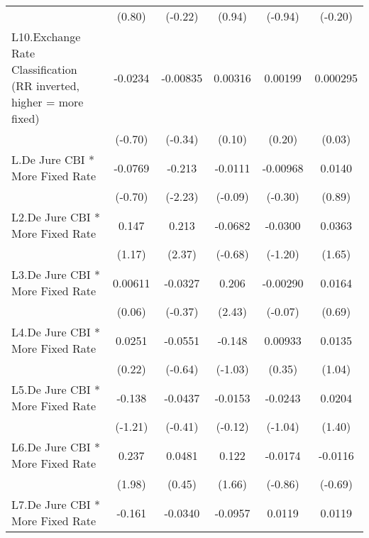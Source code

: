 {\begin{tabular*}{\linewidth}{@{\hskip\tabcolsep\extracolsep\fill}l*{5}{c}}
                &   (0.80)         &  (-0.22)         &   (0.94)         &  (-0.94)         &  (-0.20)         \\
[1em]
L10.Exchange Rate Classification (RR inverted, higher = more fixed)&  -0.0234         & -0.00835         &  0.00316         &  0.00199         & 0.000295         \\
                &  (-0.70)         &  (-0.34)         &   (0.10)         &   (0.20)         &   (0.03)         \\
[1em]
L.De Jure CBI * More Fixed Rate&  -0.0769         &   -0.213\sym{*}  &  -0.0111         & -0.00968         &   0.0140         \\
                &  (-0.70)         &  (-2.23)         &  (-0.09)         &  (-0.30)         &   (0.89)         \\
[1em]
L2.De Jure CBI * More Fixed Rate&    0.147         &    0.213\sym{*}  &  -0.0682         &  -0.0300         &   0.0363         \\
                &   (1.17)         &   (2.37)         &  (-0.68)         &  (-1.20)         &   (1.65)         \\
[1em]
L3.De Jure CBI * More Fixed Rate&  0.00611         &  -0.0327         &    0.206\sym{*}  & -0.00290         &   0.0164         \\
                &   (0.06)         &  (-0.37)         &   (2.43)         &  (-0.07)         &   (0.69)         \\
[1em]
L4.De Jure CBI * More Fixed Rate&   0.0251         &  -0.0551         &   -0.148         &  0.00933         &   0.0135         \\
                &   (0.22)         &  (-0.64)         &  (-1.03)         &   (0.35)         &   (1.04)         \\
[1em]
L5.De Jure CBI * More Fixed Rate&   -0.138         &  -0.0437         &  -0.0153         &  -0.0243         &   0.0204         \\
                &  (-1.21)         &  (-0.41)         &  (-0.12)         &  (-1.04)         &   (1.40)         \\
[1em]
L6.De Jure CBI * More Fixed Rate&    0.237\sym{*}  &   0.0481         &    0.122         &  -0.0174         &  -0.0116         \\
                &   (1.98)         &   (0.45)         &   (1.66)         &  (-0.86)         &  (-0.69)         \\
[1em]
L7.De Jure CBI * More Fixed Rate&   -0.161         &  -0.0340         &  -0.0957         &   0.0119         &   0.0119         \\

\end{tabular*}}
